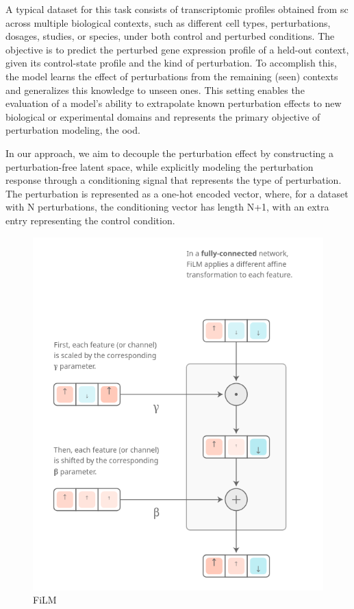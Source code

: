 \documentclass[12pt, a4paper]{article}
\begin{document}
A typical dataset for this task consists of transcriptomic profiles obtained from \gls{sc} across multiple biological contexts, such as different cell types, perturbations, dosages, studies, or species, under both control and perturbed conditions. The objective is to predict the perturbed gene expression profile of a held-out context, given its control-state profile and the kind of perturbation.
To accomplish this, the model learns the effect of perturbations from the remaining (seen) contexts and generalizes this knowledge to unseen ones. This setting enables the evaluation of a model's ability to extrapolate known perturbation effects to new biological or experimental domains and represents the primary objective of perturbation modeling, the \gls{ood}.



In our approach, we aim to decouple the perturbation effect by constructing a perturbation-free latent space, while explicitly modeling the perturbation response through a conditioning signal that represents the type of perturbation.
The perturbation is represented as a one-hot encoded vector, where, for a dataset with N perturbations, the conditioning vector has length N+1, with an extra entry representing the control condition.


\begin{figure}
  \begin{center}
    \includegraphics[width=.4\textwidth]{film_layers.png}
  \end{center}
  \caption{FiLM \cite{dumoulin2018feature-wise}}
\end{figure}
\end{document}
